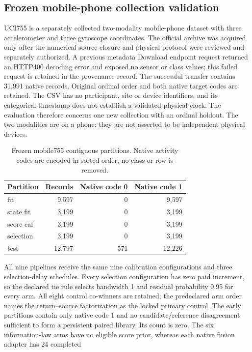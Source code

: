 \subsection{Frozen mobile-phone collection validation}
\label{sec:mobile755-frozen}
UCI755 is a separately collected two-modality mobile-phone dataset with 
three accelerometer and three gyroscope coordinates. The official archive 
was acquired only after the numerical source closure and physical protocol 
were reviewed and separately authorized. A previous metadata Download 
endpoint request returned an HTTP400 decoding error and exposed no sensor 
or class values; this failed request is retained in the provenance record. 
The successful transfer contains 31,991 native records. Original ordinal 
order and both native target codes are retained. The CSV has no participant, 
site or device identifiers, and its categorical timestamp does not establish 
a validated physical clock. The evaluation therefore concerns one new 
collection with an ordinal holdout. The two modalities are on a phone; 
they are not asserted to be independent physical devices.
\begin{table}[t]\centering\small
\caption{Frozen mobile755 contiguous partitions. Native activity codes are encoded in sorted order; no class or row is removed.}
\label{tab:mobile755-partitions}
\begin{tabular}{lrrr}\toprule
Partition & Records & Native code 0 & Native code 1\\\midrule
fit & 9,597 & 0 & 9,597 \\
state fit & 3,199 & 0 & 3,199 \\
score cal & 3,199 & 0 & 3,199 \\
selection & 3,199 & 0 & 3,199 \\
test & 12,797 & 571 & 12,226 \\
\bottomrule\end{tabular}\end{table}
All nine pipelines receive the same nine calibration configurations and 
three selection-delay schedules. Every selection configuration has zero 
paid increment, so the declared tie rule selects bandwidth 1 and residual 
probability 0.95 for every arm. All eight control co-winners are retained; 
the predeclared arm order names the return--source factorization as the 
locked primary control. The early partitions contain only native code 1 
and no candidate/reference disagreement sufficient to form a persistent 
paired library. Its count is zero. The six information-law arms have no 
eligible score prior, whereas each native fusion adapter has 24 completed 
